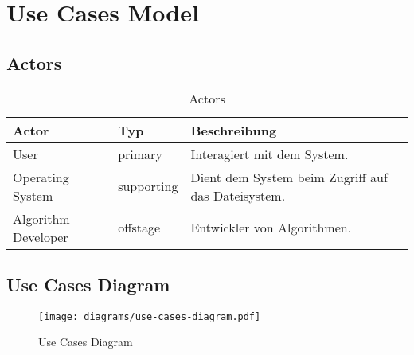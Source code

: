 \section{Use Cases Model}
\label{sec:Use Cases Model}
% 
\subsection{Actors}
\label{subsec:Actors}
\begin{table}[htp]
  \begin{tabular}[t]{|l|l|l|}\hline
	  \rowcolor{tcA}
	  Actor 		& Typ 		& Beschreibung \\\hline
	  User		 	& primary 	& Interagiert mit dem System. \\\hline
	  Operating System 	& supporting 	& Dient dem System beim Zugriff auf das Dateisystem. \\\hline
	  Algorithm Developer 	& offstage 	& Entwickler von Algorithmen. \\\hline
  \end{tabular}
  \caption{Actors}
  \label{tab:actors}
\end{table}

% 
\subsection{Use Cases Diagram}
\label{subsec:Use Cases Diagram}
\begin{figure}[H]
    \centering
    \texttt{[image: diagrams/use-cases-diagram.pdf]}
    \caption{Use Cases Diagram}
    \label{fig:use_cases_diagram}
\end{figure}
% 
